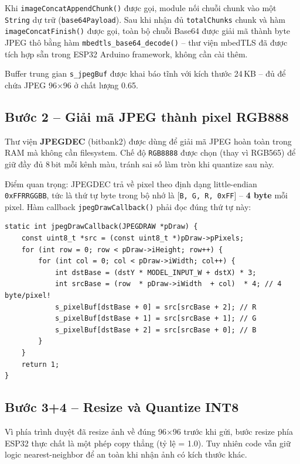 \documentclass[12pt,a4paper]{article}
\begin{document}
Khi \texttt{imageConcatAppendChunk()} được gọi, module nối chuỗi chunk vào một \texttt{String} dự trữ (\texttt{base64Payload}). Sau khi nhận đủ \texttt{totalChunks} chunk và hàm \texttt{imageConcatFinish()} được gọi, toàn bộ chuỗi Base64 được giải mã thành byte JPEG thô bằng hàm \texttt{mbedtls\_base64\_decode()} -- thư viện mbedTLS đã được tích hợp sẵn trong ESP32 Arduino framework, không cần cài thêm.

Buffer trung gian \texttt{s\_jpegBuf} được khai báo tĩnh với kích thước 24\,KB -- đủ để chứa JPEG 96×96 ở chất lượng 0.65.

\subsection{Bước 2 -- Giải mã JPEG thành pixel RGB888}

Thư viện \textbf{JPEGDEC} (bitbank2) được dùng để giải mã JPEG hoàn toàn trong RAM mà không cần filesystem. Chế độ \texttt{RGB8888} được chọn (thay vì RGB565) để giữ đầy đủ 8\,bit mỗi kênh màu, tránh sai số làm tròn khi quantize sau này.

Điểm quan trọng: JPEGDEC trả về pixel theo định dạng little-endian \texttt{0xFFRRGGBB}, tức là thứ tự byte trong bộ nhớ là [\texttt{B, G, R, 0xFF}] -- \textbf{4 byte} mỗi pixel. Hàm callback \texttt{jpegDrawCallback()} phải đọc đúng thứ tự này:

\begin{lstlisting}[caption={Callback JPEGDEC -- chú ý thứ tự byte RGB8888}]
static int jpegDrawCallback(JPEGDRAW *pDraw) {
    const uint8_t *src = (const uint8_t *)pDraw->pPixels;
    for (int row = 0; row < pDraw->iHeight; row++) {
        for (int col = 0; col < pDraw->iWidth; col++) {
            int dstBase = (dstY * MODEL_INPUT_W + dstX) * 3;
            int srcBase = (row  * pDraw->iWidth  + col)  * 4; // 4 byte/pixel!
            s_pixelBuf[dstBase + 0] = src[srcBase + 2]; // R
            s_pixelBuf[dstBase + 1] = src[srcBase + 1]; // G
            s_pixelBuf[dstBase + 2] = src[srcBase + 0]; // B
        }
    }
    return 1;
}
\end{lstlisting}

\subsection{Bước 3+4 -- Resize và Quantize INT8}

Vì phía trình duyệt đã resize ảnh về đúng 96×96 trước khi gửi, bước resize phía ESP32 thực chất là một phép copy thẳng (tỷ lệ = 1.0). Tuy nhiên code vẫn giữ logic nearest-neighbor để an toàn khi nhận ảnh có kích thước khác.
\end{document}
